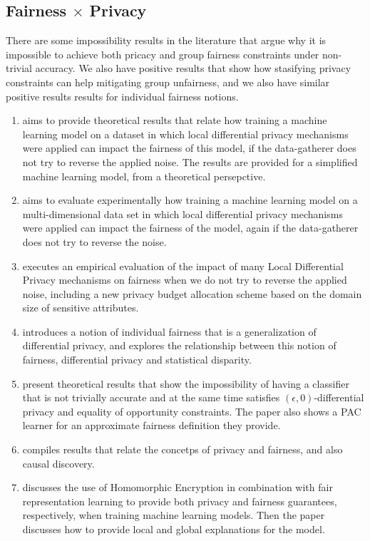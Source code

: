 \subsection{Fairness $\times$ Privacy}

There are some impossibility results in the literature that argue why it is impossible to achieve both pricacy and group fairness constraints under non-trivial accuracy\cite{Rachel}. We also have positive results that show how stasifying privacy constraints can help mitigating group unfairness\cite{makhlouf2024systematicformalstudyimpact}\cite{makhlouf2024impact}\cite{arcolezi2023local}, and we also have similar positive results results for individual fairness notions\cite{Awareness}.

\begin{enumerate}
\item \cite{makhlouf2024systematicformalstudyimpact} aims to provide theoretical results that relate how training a machine learning model on a dataset in which local differential privacy mechanisms were applied can impact the fairness of this model, if the data-gatherer does not try to reverse the applied noise. The results are provided for a simplified machine learning model, from a theoretical persepctive.
\item \cite{makhlouf2024impact} aims to evaluate experimentally how training a machine learning model on a multi-dimensional data set in which local differential privacy mechanisms were applied can impact the fairness of the model, again if the data-gatherer does not try to reverse the noise.
\item \cite{arcolezi2023local} executes an empirical evaluation of the impact of many Local Differential Privacy mechanisms on fairness when we do not try to reverse the applied noise, including a new privacy budget allocation scheme based on the domain size of sensitive attributes.
\item \cite{Awareness} introduces a notion of individual fairness that is a generalization of differential privacy, and explores the relationship between this notion of fairness, differential privacy and statistical disparity.
\item \cite{Rachel} present theoretical results that show the impossibility of having a classifier that is not trivially accurate and at the same time satisfies $(\epsilon,0)$-differential privacy and equality of opportunity constraints. The paper also shows a PAC learner for an approximate fairness definition they provide.
\item \cite{henao2023exploring} compiles results that relate the concetps of privacy and fairness, and also causal discovery.
\item \cite{franco2021toward} discusses the use of Homomorphic Encryption in combination with fair representation learning \cite{zemel2013learning} to provide both privacy and fairness guarantees, respectively, when training machine learning models. Then the paper discusses how to provide local and global explanations for the model.
\end{enumerate}

